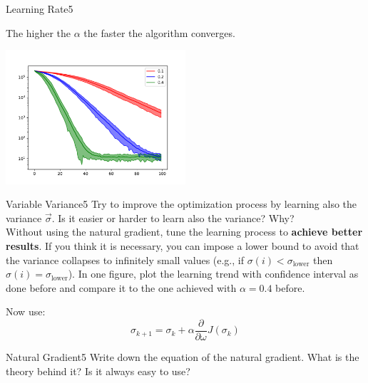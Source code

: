 \begin{questions}
\begin{question}{Learning Rate}{5}
\begin{answer}
The higher the $\alpha$ the faster the algorithm converges.

	\begin{center}
		\includegraphics[width=0.5\textwidth]{img/PG-d.pdf}
	\end{center}
\end{answer}
\end{question}

	
\begin{question}{Variable Variance}{5}
	Try to improve the optimization process by learning also the variance $\vec \sigma$. Is it easier or harder to learn also the variance? Why?
	\\Without using the natural gradient, tune the learning process to \textbf{achieve better results}. If you think it is necessary, you can impose a lower bound to avoid that the variance collapses to infinitely small values (e.g., if $\sigma(i)<\sigma_{\text{lower}}$ then $\sigma(i) = \sigma_{\text{lower}}$).
	In one figure, plot the learning trend with confidence interval as done before and compare it to the one achieved with $\alpha = 0.4$ before.
	
\begin{answer}
	Now use:
\begin{equation}
\sigma_{k+1}=\sigma_k + \alpha \frac{\partial}{\partial \omega} J({\sigma_k})
\end{equation}
\end{answer}

\end{question}


	
\begin{question}[bonus]{Natural Gradient}{5}
	Write down the equation of the natural gradient. What is the theory behind it?
	Is it always easy to use?
	

\end{question}
\end{questions}
